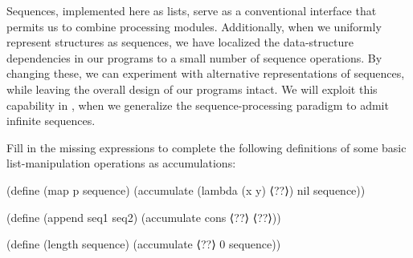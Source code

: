 Sequences, implemented here as lists, serve as a conventional interface that permits us to combine processing modules.
Additionally, when we uniformly represent structures as sequences, we have localized the data-structure dependencies in our programs to a small number of sequence operations.
By changing these, we can experiment with alternative representations of sequences, while leaving the overall design of our programs intact.
We will exploit this capability in , when we generalize the sequence-processing paradigm to admit infinite sequences.



\begin{exercise}
	\label{Exercise 2.33}
	Fill in the missing expressions to complete the following definitions of some basic list-manipulation operations as accumulations:
	\begin{scheme}
	  (define (map p sequence)
	    (accumulate (lambda (x y) ⟨??⟩) nil sequence))

	  (define (append seq1 seq2)
	    (accumulate cons ⟨??⟩ ⟨??⟩))

	  (define (length sequence)
	    (accumulate ⟨??⟩ 0 sequence))
	\end{scheme}
\end{exercise}



